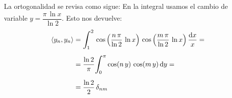 \documentclass[12pt]{article}
\def\scaleint#1{\vcenter{\hbox{\scaleto[3ex]{\displaystyle\int}{#1}}}}
\def\bs{\mkern-12mu}
\numberwithin{equation}{section}
\begin{document}
La ortogonalidad se revisa como sigue: En la integral usamos el cambio de variable $y = \dfrac{\pi \, \ln x}{\ln 2}$. Esto nos devuelve:
\begin{align}
\begin{aligned}[b]
\langle y_{n}, y_{n} \rangle &= \scaleint{6ex}_{\bs 1}^{2} \, \cos \left( \dfrac{n \, \pi}{\ln 2} \, \ln x \right) \, \cos \left( \dfrac{m \, \pi}{\ln 2} \, \ln x \right) \dfrac{\dd{x}}{x} = \\[0.5em]
&= \dfrac{\ln 2}{\pi} \scaleint{6ex}_{\bs 0}^{\pi} \cos (n \, y) \, \cos (m \, y) \dd{y} = \\[0.5em]
&= \dfrac{\ln 2}{2} \, \delta_{nm}
\end{aligned}
\label{eq:ecuacion_04_16}
\end{align}
\end{document}
